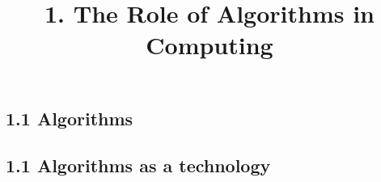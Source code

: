 
\title{\large 1. The Role of Algorithms in Computing}

\subsection*{1.1 Algorithms}


\subsection*{1.1 Algorithms as a technology}

